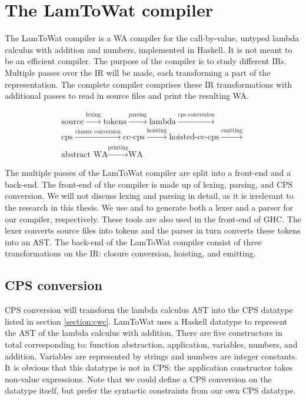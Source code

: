 
\chapter{\label{chap:compiler}The LamToWat compiler}
The LamToWat compiler is a \ac{WA} compiler for the call-by-value, untyped lambda calculus with addition and numbers, implemented in Haskell. It is not meant to be an efficient compiler. The purpose of the compiler is to study different \acp{IR}. Multiple passes over the \ac{IR} will be made, each transforming a part of the representation. The complete compiler comprises these \ac{IR} transformations with additional passes to read in source files and print the resulting \ac{WA}.

\begin{gather*}
  \mbox{source} \xrightarrow{\mbox{lexing}} \mbox{tokens} \xrightarrow{\mbox{parsing}} \mbox{lambda} \xrightarrow{\mbox{cps conversion}} \\
  \mbox{cps} \xrightarrow{\mbox{closure conversion}} \mbox{cc-cps} \xrightarrow{\mbox{hoisting}} \mbox{hoisted-cc-cps} \xrightarrow{\mbox{emitting}} \\
  \mbox{abstract WA} \xrightarrow{\mbox{printing}} \mbox{WA}
\end{gather*}

The multiple passes of the LamToWat compiler are split into a front-end and a back-end. The front-end of the compiler is made up of lexing, parsing, and \ac{CPS} conversion. We will not discuss lexing and parsing in detail, as it is irrelevant to the research in this thesis. We use \autocite{haskellalex} and \autocite{haskellhappy} to generate both a lexer and a parser for our compiler, respectively. These tools are also used in the front-end of \ac{GHC}. The lexer converts source files into tokens and the parser in turn converts these tokens into an \ac{AST}. The back-end of the LamToWat compiler consist of three transformations on the \ac{IR}: closure conversion, hoisting, and emitting.


\section{\label{section:cpsconvert}CPS conversion}
\ac{CPS} conversion will transform the lambda calculus \ac{AST} into the \ac{CPS} datatype listed in section \ref{section:cwc}. LamToWat uses a Haskell datatype to represent the \ac{AST} of the lambda calculus with addition. There are five constructors in total corresponding to: function abstraction, application, variables, numbers, and addition. Variables are represented by strings and numbers are integer constants. It is obvious that this datatype is not in \ac{CPS}: the application constructor takes non-value expressions. Note that we could define a \ac{CPS} conversion on the datatype itself, but prefer the syntactic constraints from our own \ac{CPS} datatype.

